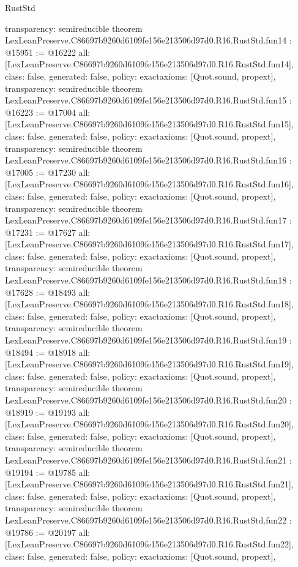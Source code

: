 \begin{lexlean}{RustStd}
\begin{coremodule}
{  transparency: semireducible
}
theorem LexLeanPreserve.C86697b9260d6109fe156e213506d97d0.R16.RustStd.fun14 : @15951 := @16222 {
  all: [LexLeanPreserve.C86697b9260d6109fe156e213506d97d0.R16.RustStd.fun14],
  class: false,
  generated: false,
  policy: exact{axioms: [Quot.sound, propext]},
  transparency: semireducible
}
theorem LexLeanPreserve.C86697b9260d6109fe156e213506d97d0.R16.RustStd.fun15 : @16223 := @17004 {
  all: [LexLeanPreserve.C86697b9260d6109fe156e213506d97d0.R16.RustStd.fun15],
  class: false,
  generated: false,
  policy: exact{axioms: [Quot.sound, propext]},
  transparency: semireducible
}
theorem LexLeanPreserve.C86697b9260d6109fe156e213506d97d0.R16.RustStd.fun16 : @17005 := @17230 {
  all: [LexLeanPreserve.C86697b9260d6109fe156e213506d97d0.R16.RustStd.fun16],
  class: false,
  generated: false,
  policy: exact{axioms: [Quot.sound, propext]},
  transparency: semireducible
}
theorem LexLeanPreserve.C86697b9260d6109fe156e213506d97d0.R16.RustStd.fun17 : @17231 := @17627 {
  all: [LexLeanPreserve.C86697b9260d6109fe156e213506d97d0.R16.RustStd.fun17],
  class: false,
  generated: false,
  policy: exact{axioms: [Quot.sound, propext]},
  transparency: semireducible
}
theorem LexLeanPreserve.C86697b9260d6109fe156e213506d97d0.R16.RustStd.fun18 : @17628 := @18493 {
  all: [LexLeanPreserve.C86697b9260d6109fe156e213506d97d0.R16.RustStd.fun18],
  class: false,
  generated: false,
  policy: exact{axioms: [Quot.sound, propext]},
  transparency: semireducible
}
theorem LexLeanPreserve.C86697b9260d6109fe156e213506d97d0.R16.RustStd.fun19 : @18494 := @18918 {
  all: [LexLeanPreserve.C86697b9260d6109fe156e213506d97d0.R16.RustStd.fun19],
  class: false,
  generated: false,
  policy: exact{axioms: [Quot.sound, propext]},
  transparency: semireducible
}
theorem LexLeanPreserve.C86697b9260d6109fe156e213506d97d0.R16.RustStd.fun20 : @18919 := @19193 {
  all: [LexLeanPreserve.C86697b9260d6109fe156e213506d97d0.R16.RustStd.fun20],
  class: false,
  generated: false,
  policy: exact{axioms: [Quot.sound, propext]},
  transparency: semireducible
}
theorem LexLeanPreserve.C86697b9260d6109fe156e213506d97d0.R16.RustStd.fun21 : @19194 := @19785 {
  all: [LexLeanPreserve.C86697b9260d6109fe156e213506d97d0.R16.RustStd.fun21],
  class: false,
  generated: false,
  policy: exact{axioms: [Quot.sound, propext]},
  transparency: semireducible
}
theorem LexLeanPreserve.C86697b9260d6109fe156e213506d97d0.R16.RustStd.fun22 : @19786 := @20197 {
  all: [LexLeanPreserve.C86697b9260d6109fe156e213506d97d0.R16.RustStd.fun22],
  class: false,
  generated: false,
  policy: exact{axioms: [Quot.sound, propext]},
}
\end{coremodule}
\end{lexlean}
